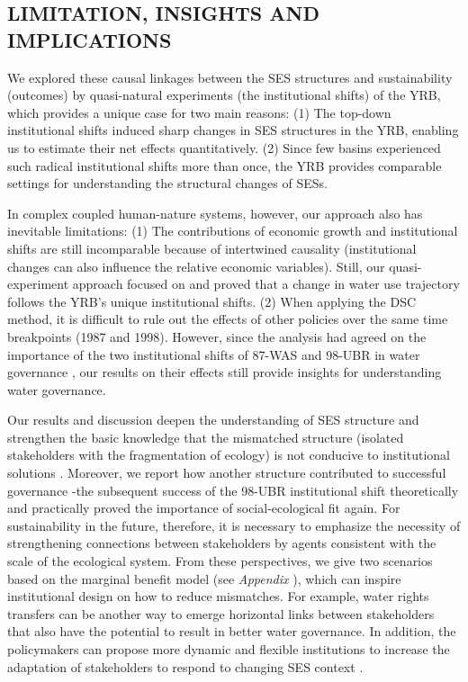 \subsection{LIMITATION, INSIGHTS AND IMPLICATIONS}
\label{discussion-3}

We explored these causal linkages between the SES structures and sustainability (outcomes) by quasi-natural experiments (the institutional shifts) of the YRB, which provides a unique case for two main reasons:
(1) The top-down institutional shifts induced sharp changes in SES structures in the YRB, enabling us to estimate their net effects quantitatively.
(2) Since few basins experienced such radical institutional shifts more than once, the YRB provides comparable settings for understanding the structural changes of SESs.

In complex coupled human-nature systems, however, our approach also has inevitable limitations:
(1) The contributions of economic growth and institutional shifts are still incomparable because of intertwined causality (institutional changes can also influence the relative economic variables).
Still, our quasi-experiment approach focused on and proved that a change in water use trajectory follows the YRB's unique institutional shifts.
(2) When applying the DSC method, it is difficult to rule out the effects of other policies over the same time breakpoints (1987 and 1998).
However, since the analysis had agreed on the importance of the two institutional shifts of 87-WAS and 98-UBR in water governance \cite{wang2012b}, our results on their effects still provide insights for understanding water governance.

Our results and discussion deepen the understanding of SES structure and strengthen the basic knowledge that the mismatched structure (isolated stakeholders with the fragmentation of ecology) is not conducive to institutional solutions \cite{bodin2017b, ostrom2009, reyers2018}.
Moreover, we report how another structure contributed to successful governance -the subsequent success of the 98-UBR institutional shift theoretically and practically proved the importance of social-ecological fit again.
For sustainability in the future, therefore, it is necessary to emphasize the necessity of strengthening connections between stakeholders by agents consistent with the scale of the ecological system.
From these perspectives, we give two scenarios based on the marginal benefit model (see \textit{Appendix }), which can inspire institutional design on how to reduce mismatches.
For example, water rights transfers can be another way to emerge horizontal links between stakeholders that also have the potential to result in better water governance.
In addition, the policymakers can propose more dynamic and flexible institutions to increase the adaptation of stakeholders to respond to changing SES context \cite{reyers2018}.

